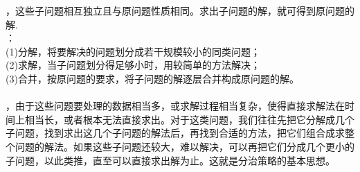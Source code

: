     
，这些子问题相互独立且与原问题性质相同。求出子问题的解，就可得到原问题的解. \\
：\\
(1)分解，将要解决的问题划分成若干规模较小的同类问题； \\
(2)求解，当子问题划分得足够小时，用较简单的方法解决； \\
(3)合并，按原问题的要求，将子问题的解逐层合并构成原问题的解。\\
\\
，由于这些问题要处理的数据相当多，或求解过程相当复杂，使得直接求解法在时间上相当长，或者根本无法直接求出。对于这类问题，我们往往先把它分解成几个子问题，找到求出这几个子问题的解法后，再找到合适的方法，把它们组合成求整个问题的解法。如果这些子问题还较大，难以解决，可以再把它们分成几个更小的子问题，以此类推，直至可以直接求出解为止。这就是分治策略的基本思想。

